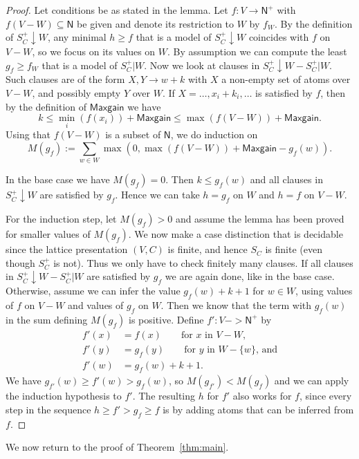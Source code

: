 \documentclass[11pt,a4paper]{article}
\newcommand{\N}{\mathsf{N}}
\newcommand\set[1]{\{#1\}}
\newcommand\Ninf{\N^+}
\newcommand\M{\mathsf{Maxgain}}
\begin{document}
\begin{proof}
Let conditions be as stated in the lemma.
Let $f: V\to\Ninf$ with $f(V-W)\subseteq \N$ be given
and denote its restriction to $W$ by $f_W$.
By the definition of $S^+_C{\downarrow}W$, any minimal $h\geq f$
that is a model of $S^+_C{\downarrow}W$
coincides with $f$ on $V-W$, so we focus on its values on $W$.
By assumption we can compute the least $g_f \geq f_W$ that 
is a model of $S^+_C|W$.
Now we look at clauses in $S^+_C{\downarrow}W - S^+_C|W$. 
Such clauses are of the form $X,Y \to w+k$ with $X$ a non-empty
set of atoms over $V-W$, and possibly empty $Y$ over $W$. 
If $X = \ldots,x_i+k_i,\ldots$ is satisfied by $f$, 
then by the definition of $\M$ we have
\[
k \leq\min_i(f(x_i)) + \M \leq \max(f(V-W)) + \M.
\]								
Using that $f(V-W)$ is a subset of $\N$, we do induction on 
\[
M(g_f) := \sum_{w \in W}  \max(0, \max(f(V-W)) + \M - g_f(w)).
\] 

In the base case we have $M(g_f)=0$.
Then $k\leq g_f(w)$ and all clauses in $S^+_C{\downarrow}W$ are 
satisfied by $g_f$.
Hence we can take $h=g_f$ on $W$ and $h=f$ on $V-W$.

For the induction step, let $M(g_f)>0$ and assume
the lemma has been proved for smaller values of $M(g_f)$.
We now make a case distinction that is decidable since
the lattice presentation $(V,C)$ is finite,
and hence $S_C$ is finite (even though $S^+_C$ is not).
Thus we only have to check finitely many clauses.
If all clauses in $S^+_C{\downarrow}W - S^+_C|W$ are satisfied 
by $g_f$ we are again done, like in the base case.
Otherwise, assume we can infer the value $g_f(w)+k+1$
for $w\in W$, using values of $f$ on $V-W$ and values 
of $g_f$ on $W$. Then we know that the term with $g_f(w)$
in the sum defining $M(g_f)$ is positive.
Define $f' : V -> \Ninf$ by 
\begin{align*}
f'(x)&= f(x)   \quad\quad\text{for $x$ in $V-W$,}\\ 
f'(y)&= g_f(y) \quad\quad\text{for $y$ in $W-\set{w}$, and}\\ 
f'(w)&= g_f(w)+k+1. 
\end{align*}
We have $g_{f'}(w) \geq f'(w) > g_f(w)$, so $M(g_{f'}) < M(g_f)$
and we can apply the induction hypothesis to $f'$.
The resulting $h$ for $f'$ also works for $f$,
since every step in the sequence 
$h \geq f' > g_f \geq f$
is by adding atoms that can be inferred from $f$.
\end{proof}

We now return to the proof of Theorem~\ref{thm:main}.
\end{document}
